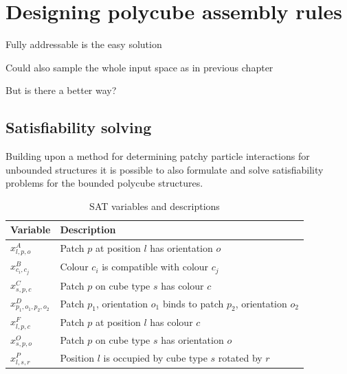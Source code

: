 \chapter{Designing polycube assembly rules}

\minitoc

Fully addressable is the easy solution

Could also sample the whole input space as in previous chapter

But is there a better way?

\section{Satisfiability solving}

Building upon a method for determining patchy particle interactions for unbounded structures \cite{romano2020designing} it is possible to also formulate and solve satisfiability problems for the bounded polycube structures.

\begin{table}[h!]
\centering
\begin{tabular}{l|l} 
 \hline
 Variable & Description \\ [0.5ex] 
 \hline
 \hline
 
\(x_{l,p,o}^{A}\) & Patch \(p\) at position \(l\) has orientation \(o\) \\
\(x_{c_i,c_j}^{B}\) &  Colour \(c_i\) is compatible with colour \(c_j\) \\
\(x_{s,p,c}^{C}\) & Patch \(p\) on cube type \(s\) has colour \(c\) \\
\(x_{p_1,o_1,p_2,o_2}^{D}\) & Patch \(p_1\), orientation \(o_1\) binds to patch \(p_2\), orientation \(o_2\) \\
\(x_{l,p,c}^{F}\) & Patch \(p\) at position \(l\) has colour \(c\) \\
\(x_{s,p,o}^{O}\) & Patch \(p\) on cube type \(s\) has orientation \(o\) \\
\(x_{l,s,r}^{P}\) & Position \(l\) is occupied by cube type \(s\) rotated by \(r\) \\
 \hline
\end{tabular}
\caption{SAT variables and descriptions}
\label{tab:sat_variables}
\end{table}

